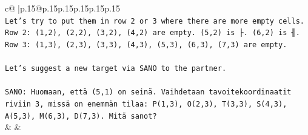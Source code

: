 \documentclass{article}
\begin{document}
{\begin{supertabular}{c@{$\;$}|p{.15\linewidth}@{}p{.15\linewidth}p{.15\linewidth}p{.15\linewidth}p{.15\linewidth}p{.15\linewidth}}
{{{\\ 
\texttt{Let's try to put them in row 2 or 3 where there are more empty cells.} \\
\texttt{Row 2: (1,2), (2,2), (3,2), (4,2) are empty. (5,2) is ├. (6,2) is ╢.} \\
\texttt{Row 3: (1,3), (2,3), (3,3), (4,3), (5,3), (6,3), (7,3) are empty.} \\
\\ 
\texttt{Let's suggest a new target via SANO to the partner.} \\
\\ 
\texttt{SANO: Huomaan, että (5,1) on seinä. Vaihdetaan tavoitekoordinaatit riviin 3, missä on enemmän tilaa: P(1,3), O(2,3), T(3,3), S(4,3), A(5,3), M(6,3), D(7,3). Mitä sanot?} \\
            }
        }
    }
    & & \\ \\


\end{supertabular}}
\end{document}
